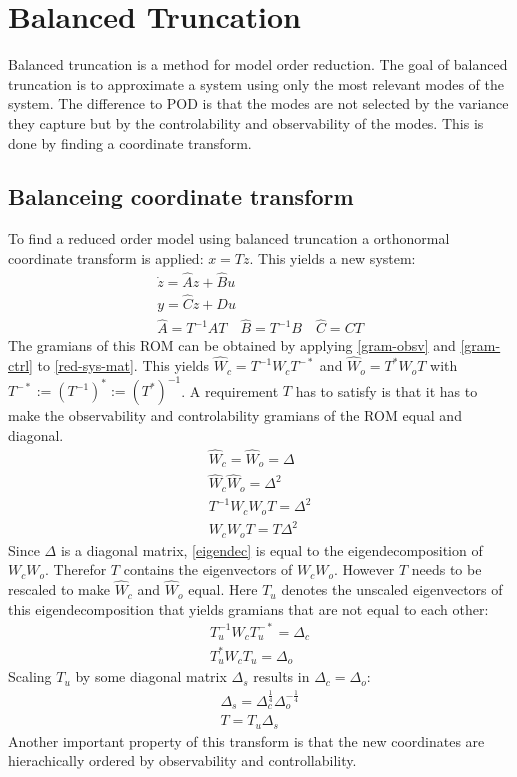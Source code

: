 \section{Balanced Truncation}
Balanced truncation is a method for model order reduction.
The goal of balanced truncation is to approximate a system using only the most relevant modes of the system.
The difference to POD is that the modes are not selected by the variance they capture but by the controlability and observability of the modes.
This is done by finding a coordinate transform.
\subsection{Balanceing coordinate transform}
To find a reduced order model using balanced truncation a orthonormal coordinate transform is applied: \(x = Tz\).
This yields a new system:
\begin{gather}
\dot{z} = \hat{A}z + \hat{B}u \label{z1}\\
y = \hat{C}z + Du \label{z2} \\
\hat{A} = T^{-1}AT \quad \hat{B} = T^{-1}B \quad \hat{C} = CT \label{red-sys-mat}
\end{gather}
The gramians of this ROM can be obtained by applying  \ref{gram-obsv} and \ref{gram-ctrl} to \ref{red-sys-mat}.
This yields \(\hat{W}_c = T^{-1}W_cT^{-*}\) and \(\hat{W}_o = T^{*}W_oT\) with  \(T^{-*} := (T^{-1})^{*} := (T^{*})^{-1}\).
A requirement \(T\) has to satisfy is that it has to make the observability and controlability gramians of the ROM equal and diagonal.
\begin{gather}
\hat{W}_c = \hat{W}_o = \Delta \\
\hat{W}_c \hat{W}_o = \Delta^{2} \\
T^{-1}W_cW_oT = \Delta^{2} \\
W_cW_oT = T\Delta^{2} \label{eigendec}
\end{gather}
Since \(\Delta\) is a diagonal matrix, \ref{eigendec} is equal to the eigendecomposition of \(W_cW_o\).
Therefor \(T\) contains the eigenvectors of \(W_cW_o\).
However \(T\) needs to be rescaled to make \(\hat{W}_c\) and \(\hat{W}_o\) equal.
Here \(T_u\) denotes the unscaled eigenvectors of this eigendecomposition that yields gramians that are not equal to each other:
\begin{gather}
T_u^{-1}W_cT_u^{-*} = \Delta_c \\
T_u^{*}W_cT_u = \Delta_o 
\end{gather}
Scaling \(T_u\) by some diagonal matrix \(\Delta_s\) results in \(\Delta_c = \Delta_o\):
\begin{gather}
\Delta_s = \Delta_c^{\frac{1}{4}}\Delta_o^{-\frac{1}{4}} \\
T = T_u \Delta_s
\end{gather}
Another important property of this transform is that the new coordinates are hierachically ordered by observability and controllability.
